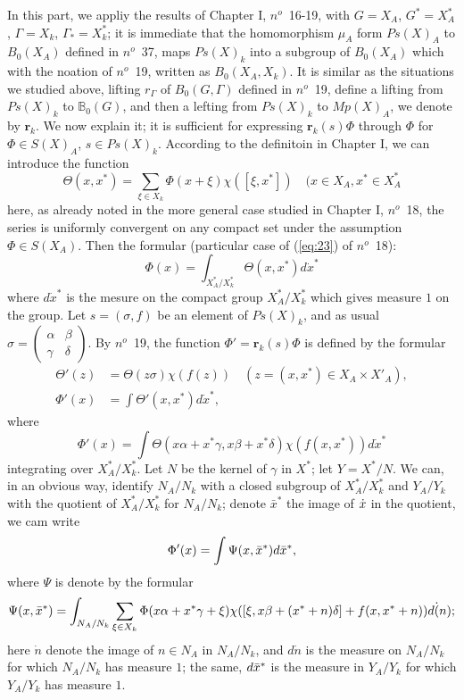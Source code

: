 \documentclass[12pt]{amsart}
\def\bB{{\mathbb{B}}}
\def\br{{\mathbf{r}}}
\newcounter{ssection}
\renewcommand{\subsection}{
  \addtocounter{ssection}{1}{\bf  \arabic{ssection}.\  }}
\begin{document}
\subsection{}
In this part, we appliy the results of Chapter I, $n^o$~16-19, 
with $G=X_A$, $G^*=X_A^*$, $\Gamma=X_k$, $\Gamma_*=X_k^*$; it is 
immediate that the homomorphism $\mu_A$ form $Ps(X)_A$ to $B_0(X_A)$
defined in $n^o$~37, maps $Ps(X)_k$ into a subgroup of $B_0(X_A)$ 
which with the noation of $n^o$~19, written as $B_0(X_A,X_k)$. 
It is similar as the situations we studied above, lifting $r_\Gamma$ of
$B_0(G,\Gamma)$ defined in $n^o$~19, define a lifting from $Ps(X)_k$
to $\bB_0(G)$, and then a lefting from $Ps(X)_k$ to $Mp(X)_A$,
we denote by $\br_k$. We now explain it; it is sufficient for expressing
$\br_k(s)\Phi$ through $\Phi$ for $\Phi\in S(X)_A$, $s\in Ps(X)_k$. 
According to the definitoin in Chapter I, we can introduce the function
\[
\Theta(x,x^*)=\sum_{\xi\in X_k} \Phi(x+\xi)\chi([\xi,x^*])
\quad (x\in X_A, x^*\in X^*_A
\]
here, as already noted in the more general case studied in Chapter I,
$n^o$~18, the series is 
uniformly convergent on any compact set under the assumption 
$\Phi\in S(X_A)$. 
Then the formular (particular case of (\ref{eq:23}) of $n^o$~18):
\[
\Phi(x)=\int_{X^*_A/X^*_k} \Theta(x,x^*) d\dot{x}^*
\]
where $d\dot{x}^*$ is the mesure on the compact group $X^*_A/X^*_k$ 
which gives measure $1$ on the group.
Let $s=(\sigma, f)$ be an element of $Ps(X)_k$, and as usual 
$\sigma=\begin{pmatrix}\alpha & \beta\\ \gamma & \delta
\end{pmatrix}$.
By $n^o$~19, the function $\Phi' = \br_k(s)\Phi$ is defined by the
formular
\begin{align*}
\Theta'(z) &= \Theta(z\sigma)\chi(f(z)) \quad (z=(x,x^*)\in X_A\times X'_A),\\
\Phi'(x) &= \int \Theta'(x,x^*) d\dot{x}^*,
\end{align*}
where
\[
\Phi'(x) = \int \Theta(x\alpha + x^*\gamma, x\beta+x^*\delta)\chi(f(x,x^*))
d\dot{x}^*
\]
integrating over $X^*_A/X^*_k$. 
Let $N$ be the kernel of $\gamma$ in $X^*$; let $Y=X^*/N$. 
We can, in an obvious way, identify $N_A/N_k$ with a closed subgroup of 
$X^*_A/X^*_k$ and $Y_A/Y_k$ with the quotient of $X^*_A/X^*_k$ for $N_A/N_k$;
denote $\bar{x}^*$ the image of ${\dot{x}}$ in the quotient, we cam write
\[
\Phi'(x) = \int \Psi(x,{\bar{x}}^*)d{\bar{x}}^*,
\]
where $\Psi$ is denote by the formular
\[
\Psi(x, {\bar{x}}^*)=\int_{N_A/N_k} \sum_{\xi\in X_k} \Phi(x\alpha + x^*\gamma+\xi)
\chi([\xi, x\beta+(x^*+n)\delta]+f(x, x^*+n))d\dot(n);
\]
here $\dot{n}$ denote the image of $n\in N_A$ in $N_A/N_k$,
and $d\dot{n}$ is the measure on $N_A/N_k$ for which $N_A/N_k$ has measure $1$;
the same, $d{\bar{x}}^*$ is the measure in $Y_A/Y_k$ for which $Y_A/Y_k$ has measure
$1$.
\end{document}
